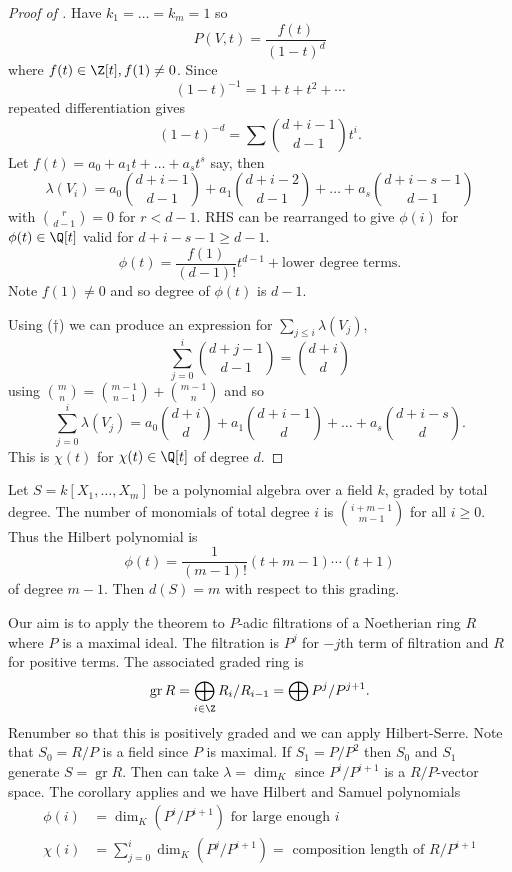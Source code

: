 \documentclass[a4paper]{article}
\DeclareMathOperator{\gr}{gr} %
\begin{document}
\begin{proof}[Proof of ]
  Have \(k_1 = \dots = k_m = 1\) so
  \[
    P(V, t) = \frac{f(t)}{(1 - t)^d}
  \]
  where \(f(t) \in \Z[t], f(1) \neq 0\). Since
  \[
    (1 - t)^{-1} = 1 + t + t^2 + \cdots
  \]
  repeated differentiation gives
  \[
    (1 - t)^{-d} = \sum \binom{d + i - 1}{d - 1} t^i.
  \]
  Let \(f(t) = a_0 + a_1 t + \dots + a_s t^s\) say, then
  \[
    \lambda(V_i) = a_0 \binom{d + i - 1}{d - 1} + a_1 \binom{d + i - 2}{d - 1} + \dots + a_s \binom{d + i - s - 1}{d - 1}
    \tag{\(\dagger\)}
  \]
  with \(\binom{r}{d - 1} = 0\) for \(r < d - 1\). RHS can be rearranged to give \(\phi(i)\) for \(\phi(t) \in \Q[t]\) valid for \(d + i - s - 1 \geq d - 1\).
  \[
    \phi(t) = \frac{f(1)}{(d - 1)!} t^{d - 1} + \text{lower degree terms}.
  \]
  Note \(f(1) \neq 0\) and so degree of \(\phi(t)\) is \(d - 1\).

  Using (\(\dagger\)) we can produce an expression for \(\sum_{j \leq i} \lambda(V_j)\),
  \[
    \sum_{j = 0}^i \binom{d + j - 1}{d - 1} = \binom{d + i}{d}
  \]
  using \(\binom{m}{n} = \binom{m - 1}{n - 1} + \binom{m - 1}{n}\) and so
  \[
    \sum_{j = 0}^i \lambda(V_j) = a_0 \binom{d + i}{d} + a_1 \binom{d + i - 1}{d} + \dots + a_s \binom{d + i - s}{d}.
  \]
  This is \(\chi(t)\) for \(\chi(t) \in \Q[t]\) of degree \(d\).
\end{proof}

\begin{eg}
  Let \(S = k[X_1, \dots, X_m]\) be a polynomial algebra over a field \(k\), graded by total degree. The number of monomials of total degree \(i\) is \(\binom{i + m - 1}{m - 1}\) for all \(i \geq 0\). Thus the Hilbert polynomial is
  \[
    \phi(t) = \frac{1}{(m - 1)!} (t + m - 1) \cdots (t + 1)
  \]
  of degree \(m - 1\). Then \(d(S) = m\) with respect to this grading.
\end{eg}

Our aim is to apply the theorem to \(P\)-adic filtrations of a Noetherian ring \(R\) where \(P\) is a maximal ideal. The filtration is \(P^j\) for \(-j\)th term of filtration and \(R\) for positive terms. The associated graded ring is
\[
  \gr R = \bigoplus_{i \in \Z} R_i/R_{i - 1} = \bigoplus P^j/P^{j + 1}.
\]
Renumber so that this is positively graded and we can apply Hilbert-Serre. Note that \(S_0 = R/P\) is a field since \(P\) is maximal. If \(S_1 = P/P^2\) then \(S_0\) and \(S_1\) generate \(S = \gr R\). Then can take \(\lambda = \dim_K\) since \(P^i/P^{i + 1}\) is a \(R/P\)-vector space. The corollary applies and we have Hilbert and Samuel polynomials
\begin{align*}
  \phi(i) &= \dim_K(P^i/P^{i + 1}) \text{ for large enough } i \\
  \chi(i) &= \sum_{j = 0}^i \dim_K(P^j/P^{i + 1}) = \text{ composition length of } R/P^{i + 1}
\end{align*}
\end{document}
